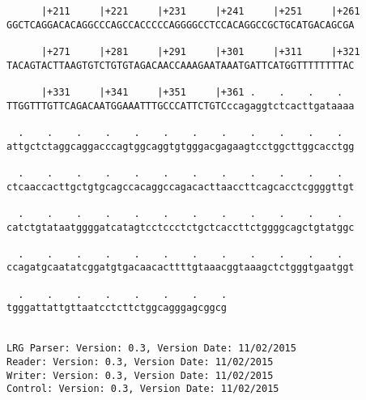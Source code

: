 \documentclass{article}
\begin{document}
\begin{Verbatim}
      |+211     |+221     |+231     |+241     |+251     |+261
GGCTCAGGACACAGGCCCAGCCACCCCCAGGGGCCTCCACAGGCCGCTGCATGACAGCGA
                                                            
      |+271     |+281     |+291     |+301     |+311     |+321
TACAGTACTTAAGTGTCTGTGTAGACAACCAAAGAATAAATGATTCATGGTTTTTTTTAC
                                                            
      |+331     |+341     |+351     |+361 .    .    .    .  
TTGGTTTGTTCAGACAATGGAAATTTGCCCATTCTGTCccagaggtctcacttgataaaa
                                                            
  .    .    .    .    .    .    .    .    .    .    .    .  
attgctctaggcaggacccagtggcaggtgtgggacgagaagtcctggcttggcacctgg
                                                            
  .    .    .    .    .    .    .    .    .    .    .    .  
ctcaaccacttgctgtgcagccacaggccagacacttaaccttcagcacctcggggttgt
                                                            
  .    .    .    .    .    .    .    .    .    .    .    .  
catctgtataatggggatcatagtcctccctctgctcaccttctggggcagctgtatggc
                                                            
  .    .    .    .    .    .    .    .    .    .    .    .  
ccagatgcaatatcggatgtgacaacacttttgtaaacggtaaagctctgggtgaatggt
                                                            
  .    .    .    .    .    .    .    .
tgggattattgttaatcctcttctggcagggagcggcg
                                      
                                      
LRG Parser: Version: 0.3, Version Date: 11/02/2015
Reader: Version: 0.3, Version Date: 11/02/2015
Writer: Version: 0.3, Version Date: 11/02/2015
Control: Version: 0.3, Version Date: 11/02/2015
\end{Verbatim}
\end{document}
